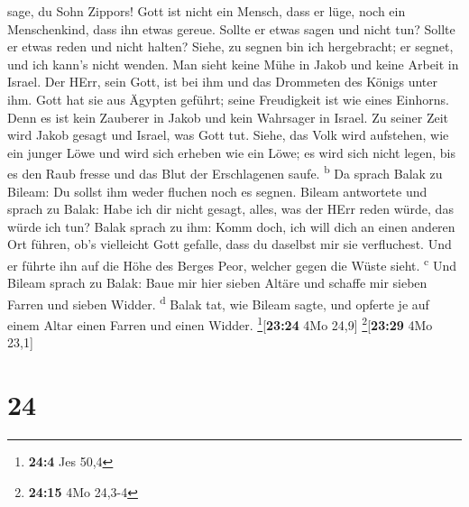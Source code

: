 sage, du Sohn Zippors!  Gott ist nicht ein Mensch, dass
er lüge, noch ein Menschenkind, dass ihn etwas gereue. Sollte er etwas
sagen und nicht tun? Sollte er etwas reden und nicht halten?
 Siehe, zu segnen bin ich hergebracht; er segnet, und ich
kann's nicht wenden.  Man sieht keine Mühe in Jakob und
keine Arbeit in Israel. Der HErr, sein Gott, ist bei ihm und das
Drommeten des Königs unter ihm.  Gott hat sie aus Ägypten
geführt; seine Freudigkeit ist wie eines Einhorns.  Denn
es ist kein Zauberer in Jakob und kein Wahrsager in Israel. Zu seiner
Zeit wird Jakob gesagt und Israel, was Gott tut.  Siehe,
das Volk wird aufstehen, wie ein junger Löwe und wird sich erheben wie
ein Löwe; es wird sich nicht legen, bis es den Raub fresse und das Blut
der Erschlagenen saufe. \textsuperscript{b}  Da sprach
Balak zu Bileam: Du sollst ihm weder fluchen noch es segnen.
 Bileam antwortete und sprach zu Balak: Habe ich dir
nicht gesagt, alles, was der HErr reden würde, das würde ich tun?
 Balak sprach zu ihm: Komm doch, ich will dich an einen
anderen Ort führen, ob's vielleicht Gott gefalle, dass du daselbst mir
sie verfluchest.  Und er führte ihn auf die Höhe des
Berges Peor, welcher gegen die Wüste sieht. \textsuperscript{c}
 Und Bileam sprach zu Balak: Baue mir hier sieben Altäre
und schaffe mir sieben Farren und sieben Widder. \textsuperscript{d}
 Balak tat, wie Bileam sagte, und opferte je auf einem
Altar einen Farren und einen Widder. \footnote{\textbf{24:4} Jes 50,4}{[}\textbf{23:24}
4Mo 24,9{]} \footnote{\textbf{24:15} 4Mo 24,3-4}{[}\textbf{23:29} 4Mo
23,1{]}

\hypertarget{section-23}{%
\section{24}\label{section-23}}

